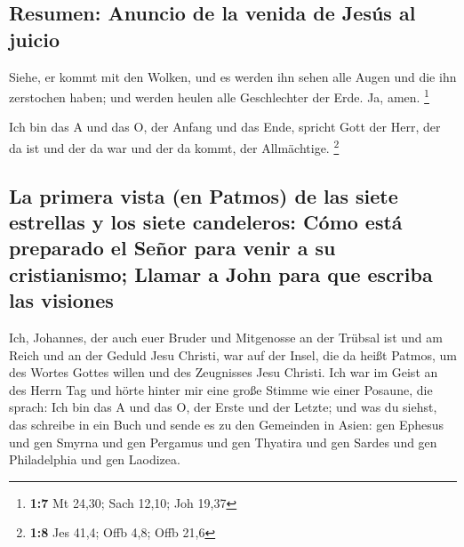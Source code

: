 \hypertarget{resumen-anuncio-de-la-venida-de-jesuxfas-al-juicio}{%
\subsection{Resumen: Anuncio de la venida de Jesús al
juicio}\label{resumen-anuncio-de-la-venida-de-jesuxfas-al-juicio}}

 Siehe, er kommt mit den Wolken, und es werden ihn sehen
alle Augen und die ihn zerstochen haben; und werden heulen alle
Geschlechter der Erde. Ja, amen. \footnote{\textbf{1:7} Mt 24,30; Sach
  12,10; Joh 19,37}

 Ich bin das A und das O, der Anfang und das Ende, spricht
Gott der Herr, der da ist und der da war und der da kommt, der
Allmächtige. \footnote{\textbf{1:8} Jes 41,4; Offb 4,8; Offb 21,6}

\hypertarget{la-primera-vista-en-patmos-de-las-siete-estrellas-y-los-siete-candeleros-cuxf3mo-estuxe1-preparado-el-seuxf1or-para-venir-a-su-cristianismo-llamar-a-john-para-que-escriba-las-visiones}{%
\subsection{La primera vista (en Patmos) de las siete estrellas y los
siete candeleros: Cómo está preparado el Señor para venir a su
cristianismo; Llamar a John para que escriba las
visiones}\label{la-primera-vista-en-patmos-de-las-siete-estrellas-y-los-siete-candeleros-cuxf3mo-estuxe1-preparado-el-seuxf1or-para-venir-a-su-cristianismo-llamar-a-john-para-que-escriba-las-visiones}}

 Ich, Johannes, der auch euer Bruder und Mitgenosse an der
Trübsal ist und am Reich und an der Geduld Jesu Christi, war auf der
Insel, die da heißt Patmos, um des Wortes Gottes willen und des
Zeugnisses Jesu Christi.  Ich war im Geist an des Herrn
Tag und hörte hinter mir eine große Stimme wie einer Posaune,
 die sprach: Ich bin das A und das O, der Erste und der
Letzte; und was du siehst, das schreibe in ein Buch und sende es zu den
Gemeinden in Asien: gen Ephesus und gen Smyrna und gen Pergamus und gen
Thyatira und gen Sardes und gen Philadelphia und gen Laodizea.


